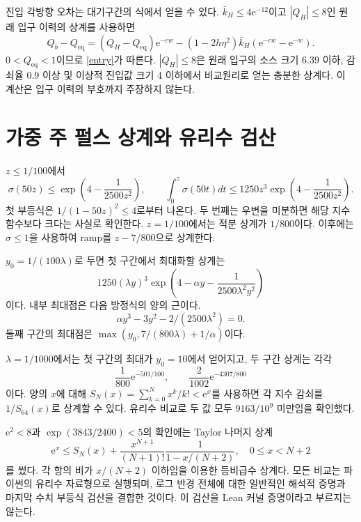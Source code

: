\documentclass[11pt,a4paper]{article}
\theoremstyle{definition}
\theoremstyle{remark}\newtheorem{remark}[theorem]{주의}
\newcommand{\e}{\mathrm e}
\newcommand{\eq}{\mathrm{eq}}
\begin{document}
진입 각방향 오차는 대기구간의 식에서 얻을 수 있다. $\bar k_H\le4\e^{-12}$이고 $|Q_H|\le8$인 원래 입구 이력의 상계를 사용하면
\begin{equation}
 Q_b-Q_\eq=(Q_H-Q_\eq)\e^{-cw}
 -(1-2h\eta^2)\bar k_H(\e^{-cw}-\e^{-w}).
\end{equation}
$0<Q_\eq<1$이므로 \eqref{entry}가 따른다. $|Q_H|\le8$은 원래 입구의 소스 크기 $6.39$ 이하, 감쇠율 $0.9$ 이상 및 이상적 진입값 크기 4 이하에서 비교원리로 얻는 충분한 상계다. 이 계산은 입구 이력의 부호까지 주장하지 않는다.

\section{가중 주 펄스 상계와 유리수 검산}
$z\le1/100$에서
\begin{equation}
 \sigma(50z)\le\exp\left(4-\frac1{2500z^2}\right),\qquad
 \int_0^z\sigma(50t)dt\le1250z^3\exp\left(4-\frac1{2500z^2}\right).
\end{equation}
첫 부등식은 $1/(1-50z)^2\le4$로부터 나온다. 두 번째는 우변을 미분하면 해당 지수 함수보다 크다는 사실로 확인한다. $z=1/100$에서는 적분 상계가 $1/800$이다. 이후에는 $\sigma\le1$을 사용하여 ramp를 $z-7/800$으로 상계한다.

$y_0=1/(100\lambda)$로 두면 첫 구간에서 최대화할 상계는
\begin{equation}
1250(\lambda y)^3\exp\left(4-\alpha y-\frac1{2500\lambda^2 y^2}\right)
\end{equation}
이다. 내부 최대점은 다음 방정식의 양의 근이다.
\begin{equation}
\alpha y^3-3y^2-2/(2500\lambda^2)=0.
\end{equation}
둘째 구간의 최대점은 $\max(y_0,7/(800\lambda)+1/\alpha)$이다.

$\lambda=1/1000$에서는 첫 구간의 최대가 $y_0=10$에서 얻어지고, 두 구간 상계는 각각
\begin{equation}
 \frac1{800}\e^{-501/100},\qquad
 \frac{2}{1002}\e^{-4307/800}
\end{equation}
이다. 양의 $x$에 대해 $S_N(x)=\sum_{k=0}^N x^k/k!<\e^x$를 사용하면
각 지수 감쇠를 $1/S_{64}(x)$로 상계할 수 있다. 유리수 비교로 두 값 모두
$9163/10^9$ 미만임을 확인했다.

$\e^2<8$과 $\exp(3843/2400)<5$의 확인에는 Taylor 나머지 상계
\begin{equation}
 \e^x\le S_N(x)+\frac{x^{N+1}}{(N+1)!}\frac1{1-x/(N+2)},\quad 0\le x<N+2
\end{equation}
를 썼다. 각 항의 비가 $x/(N+2)$ 이하임을 이용한 등비급수 상계다. 모든 비교는 파이썬의 유리수 자료형으로 실행되며, 로그 반경 전체에 대한 일반적인 해석적 증명과 마지막 수치 부등식 검산을 결합한 것이다. 이 검산을 Lean 커널 증명이라고 부르지는 않는다.
\end{document}
